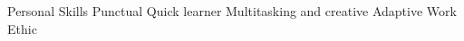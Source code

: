 \begin{rubric}{Personal Skills}
\entry* Punctual
\entry* Quick learner
\entry* Multitasking and creative
\entry* Adaptive
\entry* Work Ethic
\end{rubric}
